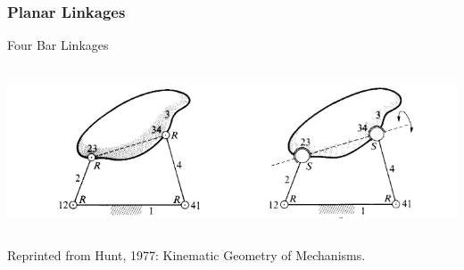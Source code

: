 \begin{frame}
	\frametitle{Planar Linkages}	
	\begin{block}{Four Bar Linkages}
		\begin{columns}[b]
			\begin{column}{\linewidth}		
				\centering 
				\includegraphics[width=\textwidth]{../Notes/figures/four-bar-linkage.png}
			\end{column}	
		\end{columns}
		\footnotesize{Reprinted from Hunt, 1977: Kinematic Geometry of Mechanisms.}
	\end{block}
	\label{fig:4bar_hunt}
\end{frame}

